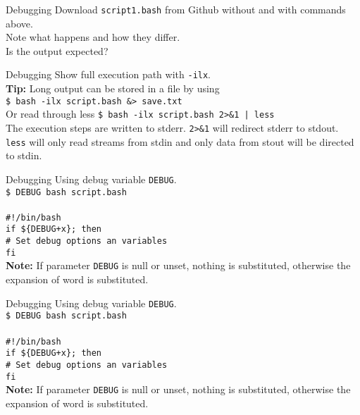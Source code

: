 \documentclass{beamer}
\let\tt\texttt
\let\bf\textbf
\begin{document}
\begin{frame}{Debugging}
    Download \tt{script1.bash} from Github without and with commands above. \\
    Note what happens and how they differ.      \\
    Is the output expected?                     \\
\end{frame}

\begin{frame}{Debugging}
    Show full execution path with \tt{-ilx}.    \\
    \bf{Tip:} Long output can be stored in a file by using  \\
    \quad \tt{\$ bash -ilx script.bash \&> save.txt}         \\
    Or read through less
    \quad \tt{\$ bash -ilx script.bash 2>\&1 | less}         \\
    The execution steps are written to stderr. \tt{2>\&1} will redirect stderr to stdout. \tt{less} will only read streams from stdin and only data from stout will be directed to stdin.
\end{frame}

\begin{frame}{Debugging}
    Using debug variable \tt{DEBUG}.    \\
    \tt{\$ DEBUG bash script.bash}      \\
    \quad   \\
    \tt{\#!/bin/bash}                   \\
    \tt{if \$\{DEBUG+x\}; then}         \\
    \quad \tt{\# Set debug options an variables}  \\
    \tt{fi}                             \\
    \bf{Note:} If parameter \tt{DEBUG} is null or unset, nothing is substituted, otherwise the expansion of word is substituted.   \\
\end{frame}

\begin{frame}{Debugging}
    Using debug variable \tt{DEBUG}.    \\
    \tt{\$ DEBUG bash script.bash}      \\
    \quad   \\
    \tt{\#!/bin/bash}                   \\
    \tt{if \$\{DEBUG+x\}; then}         \\
    \quad \tt{\# Set debug options an variables}  \\
    \tt{fi}                             \\
    \bf{Note:} If parameter \tt{DEBUG} is null or unset, nothing is substituted, otherwise the expansion of word is substituted.   \\
\end{frame}
\end{document}
